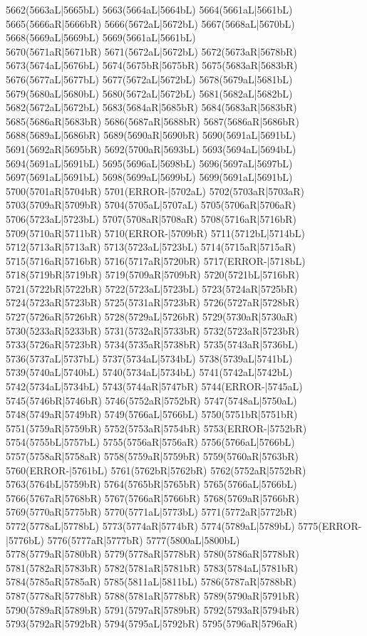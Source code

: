 5662(5663aL|5665bL) 5663(5664aL|5664bL) 5664(5661aL|5661bL) 5665(5666aR|5666bR) 5666(5672aL|5672bL) 5667(5668aL|5670bL) 5668(5669aL|5669bL) 5669(5661aL|5661bL) \\5670(5671aR|5671bR) 5671(5672aL|5672bL) 5672(5673aR|5678bR) 5673(5674aL|5676bL) 5674(5675bR|5675bR) 5675(5683aR|5683bR) 5676(5677aL|5677bL) 5677(5672aL|5672bL) 5678(5679aL|5681bL) \\5679(5680aL|5680bL) 5680(5672aL|5672bL) 5681(5682aL|5682bL) 5682(5672aL|5672bL) 5683(5684aR|5685bR) 5684(5683aR|5683bR) 5685(5686aR|5683bR) 5686(5687aR|5688bR) 5687(5686aR|5686bR) \\5688(5689aL|5686bR) 5689(5690aR|5690bR) 5690(5691aL|5691bL) 5691(5692aR|5695bR) 5692(5700aR|5693bL) 5693(5694aL|5694bL) 5694(5691aL|5691bL) 5695(5696aL|5698bL) 5696(5697aL|5697bL) \\5697(5691aL|5691bL) 5698(5699aL|5699bL) 5699(5691aL|5691bL) 5700(5701aR|5704bR) 5701(ERROR-|5702aL) 5702(5703aR|5703aR) 5703(5709aR|5709bR) 5704(5705aL|5707aL) 5705(5706aR|5706aR) \\5706(5723aL|5723bL) 5707(5708aR|5708aR) 5708(5716aR|5716bR) 5709(5710aR|5711bR) 5710(ERROR-|5709bR) 5711(5712bL|5714bL) 5712(5713aR|5713aR) 5713(5723aL|5723bL) 5714(5715aR|5715aR) \\5715(5716aR|5716bR) 5716(5717aR|5720bR) 5717(ERROR-|5718bL) 5718(5719bR|5719bR) 5719(5709aR|5709bR) 5720(5721bL|5716bR) 5721(5722bR|5722bR) 5722(5723aL|5723bL) 5723(5724aR|5725bR) \\5724(5723aR|5723bR) 5725(5731aR|5723bR) 5726(5727aR|5728bR) 5727(5726aR|5726bR) 5728(5729aL|5726bR) 5729(5730aR|5730aR) 5730(5233aR|5233bR) 5731(5732aR|5733bR) 5732(5723aR|5723bR) \\5733(5726aR|5723bR) 5734(5735aR|5738bR) 5735(5743aR|5736bL) 5736(5737aL|5737bL) 5737(5734aL|5734bL) 5738(5739aL|5741bL) 5739(5740aL|5740bL) 5740(5734aL|5734bL) 5741(5742aL|5742bL) \\5742(5734aL|5734bL) 5743(5744aR|5747bR) 5744(ERROR-|5745aL) 5745(5746bR|5746bR) 5746(5752aR|5752bR) 5747(5748aL|5750aL) 5748(5749aR|5749bR) 5749(5766aL|5766bL) 5750(5751bR|5751bR) \\5751(5759aR|5759bR) 5752(5753aR|5754bR) 5753(ERROR-|5752bR) 5754(5755bL|5757bL) 5755(5756aR|5756aR) 5756(5766aL|5766bL) 5757(5758aR|5758aR) 5758(5759aR|5759bR) 5759(5760aR|5763bR) \\5760(ERROR-|5761bL) 5761(5762bR|5762bR) 5762(5752aR|5752bR) 5763(5764bL|5759bR) 5764(5765bR|5765bR) 5765(5766aL|5766bL) 5766(5767aR|5768bR) 5767(5766aR|5766bR) 5768(5769aR|5766bR) \\5769(5770aR|5775bR) 5770(5771aL|5773bL) 5771(5772aR|5772bR) 5772(5778aL|5778bL) 5773(5774aR|5774bR) 5774(5789aL|5789bL) 5775(ERROR-|5776bL) 5776(5777aR|5777bR) 5777(5800aL|5800bL) \\5778(5779aR|5780bR) 5779(5778aR|5778bR) 5780(5786aR|5778bR) 5781(5782aR|5783bR) 5782(5781aR|5781bR) 5783(5784aL|5781bR) 5784(5785aR|5785aR) 5785(5811aL|5811bL) 5786(5787aR|5788bR) \\5787(5778aR|5778bR) 5788(5781aR|5778bR) 5789(5790aR|5791bR) 5790(5789aR|5789bR) 5791(5797aR|5789bR) 5792(5793aR|5794bR) 5793(5792aR|5792bR) 5794(5795aL|5792bR) 5795(5796aR|5796aR) 